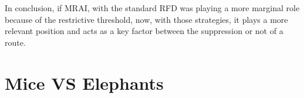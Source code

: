 In conclusion, if \ac{MRAI}, with the standard \ac{RFD} was playing a more
marginal role because of the restrictive threshold, now, with those strategies,
it plays a more relevant position and acts as a key factor between the suppression
or not of a route.


\section{Mice VS Elephants}
\label{sec:bgp_rfd_mice_vs_elephants}

